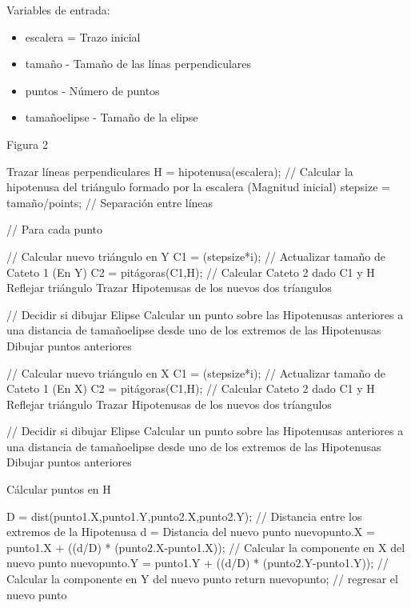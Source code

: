 \documentclass[letter,10pt]{article}
\begin{document}
 

Variables de entrada:
\begin{itemize}
	\item  escalera = Trazo inicial
	\item  tamaño - Tamaño de las línas perpendiculares
	\item  puntos - Número de puntos
	\item tamañoelipse - Tamaño de la elipse
\end{itemize}

\begin{algorithm}
	\caption{Figura 2} 
	\begin{algorithmic}[1]

		\State Trazar líneas perpendiculares
		\State H = hipotenusa(escalera); // Calcular la hipotenusa del triángulo formado por la escalera (Magnitud inicial)
		\State stepsize = tamaño/points; // Separación entre líneas

		 // Para cada punto

			\State // Calcular nuevo triángulo en Y
			\State  C1 = (stepsize*i);   // Actualizar tamaño de Cateto 1 (En Y)
			\State  C2 = pitágoras(C1,H); // Calcular Cateto 2 dado C1 y H
			\State  Reflejar triángulo
			\State 	Trazar Hipotenusas de los nuevos dos tríangulos
			
			 // Decidir si dibujar Elipse
				\State Calcular un punto sobre las Hipotenusas anteriores a una distancia de tamañoelipse desde uno de los extremos de las Hipotenusas
				\State Dibujar puntos anteriores
			\EndIf

			\State // Calcular nuevo triángulo en X
			\State  C1 = (stepsize*i);   // Actualizar tamaño de Cateto 1 (En X)
			\State  C2 = pitágoras(C1,H); // Calcular Cateto 2 dado C1 y H
			\State  Reflejar triángulo
			\State 	Trazar Hipotenusas de los nuevos dos tríangulos
			
			 // Decidir si dibujar Elipse
				\State Calcular un punto sobre las Hipotenusas anteriores a una distancia de tamañoelipse desde uno de los extremos de las Hipotenusas
				\State Dibujar puntos anteriores
			\EndIf
		\EndFor
	\end{algorithmic} 
\end{algorithm}

\begin{algorithm}
	\caption{Cálcular puntos en H} 
	\begin{algorithmic}[1]
        \State D = dist(punto1.X,punto1.Y,punto2.X,punto2.Y); // Distancia entre los extremos de la Hipotenusa
        \State d = Distancia del nuevo punto
        \State nuevopunto.X = punto1.X + ((d/D) * (punto2.X-punto1.X)); // Calcular la componente en X del nuevo punto
        \State nuevopunto.Y = punto1.Y + ((d/D) * (punto2.Y-punto1.Y)); // Calcular la componente en Y del nuevo punto
        \State return nuevopunto; // regresar el nuevo punto
	\end{algorithmic} 
\end{algorithm}
\end{document}
